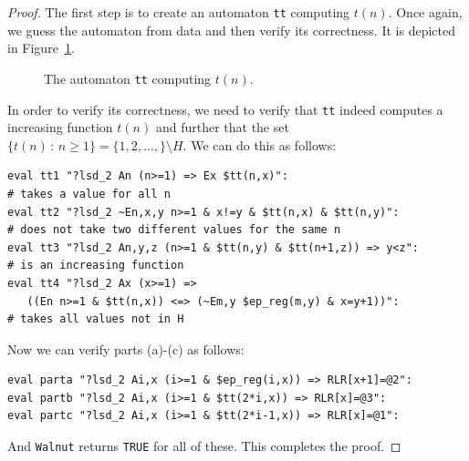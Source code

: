\documentclass[10pt,a4paper]{amsart}
\begin{document}
\begin{proof}
The first step is to create an automaton {\tt tt} computing $t(n)$.  Once again,
we guess the automaton from data and then verify its correctness.
It is depicted in Figure~\ref{fig9}.
\begin{figure}[htb]
\begin{center}

\end{center}
\caption{The automaton {\tt tt} computing $t(n)$.}
\label{fig9}
\end{figure}

In order to verify its correctness,
we need to verify that {\tt tt} indeed computes a increasing function $t(n)$
and further that the set $\{ t(n) \, : \, n \geq 1 \} =
\{ 1,2, \ldots, \} \setminus H$. We can do this as follows:
\begin{verbatim}
eval tt1 "?lsd_2 An (n>=1) => Ex $tt(n,x)":
# takes a value for all n
eval tt2 "?lsd_2 ~En,x,y n>=1 & x!=y & $tt(n,x) & $tt(n,y)":
# does not take two different values for the same n
eval tt3 "?lsd_2 An,y,z (n>=1 & $tt(n,y) & $tt(n+1,z)) => y<z":
# is an increasing function
eval tt4 "?lsd_2 Ax (x>=1) => 
   ((En n>=1 & $tt(n,x)) <=> (~Em,y $ep_reg(m,y) & x=y+1))":
# takes all values not in H
\end{verbatim}

Now we can verify parts (a)-(c) as follows:
\begin{verbatim}
eval parta "?lsd_2 Ai,x (i>=1 & $ep_reg(i,x)) => RLR[x+1]=@2":
eval partb "?lsd_2 Ai,x (i>=1 & $tt(2*i,x)) => RLR[x]=@3":
eval partc "?lsd_2 Ai,x (i>=1 & $tt(2*i-1,x)) => RLR[x]=@1":
\end{verbatim}
And {\tt Walnut} returns {\tt TRUE} for all of these.  This completes the
proof.
\end{proof}
\end{document}
